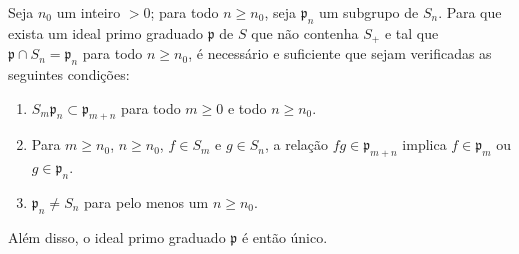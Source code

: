 \documentclass[oneside,10pt]{amsart}
\renewcommand{\geq}{\geqslant}
\let\EGAOriginalLabel\label
\renewcommand{\label}[1]{\phantomsection\EGAOriginalLabel{#1}}
\begin{document}
\begin{proposition}[2.1.9]
\label{II.2.1.9}
Seja $n_0$ um inteiro $>0$; para todo $n\geq n_0$, seja $\mathfrak{p}_n$ um subgrupo de $S_n$.
Para que exista um ideal primo graduado $\mathfrak{p}$ de $S$ que não contenha $S_+$ e tal que $\mathfrak{p}\cap S_n=\mathfrak{p}_n$ para todo $n\geq n_0$, é necessário e suficiente que sejam verificadas as seguintes condições:
\begin{enumerate}
  \item[{\rm($1^\circ$)}] $S_m\mathfrak{p}_n\subset\mathfrak{p}_{m+n}$ para todo $m\geq0$ e todo $n\geq n_0$.
  \item[{\rm($2^\circ$)}] Para $m\geq n_0$, $n\geq n_0$, $f\in S_m$ e $g\in S_n$, a relação $fg\in\mathfrak{p}_{m+n}$ implica $f\in\mathfrak{p}_m$ ou $g\in\mathfrak{p}_n$.
  \item[{\rm($3^\circ$)}] $\mathfrak{p}_n\neq S_n$ para pelo menos um $n\geq n_0$.
\end{enumerate}
Além disso, o ideal primo graduado $\mathfrak{p}$ é então único.
\end{proposition}
\end{document}
